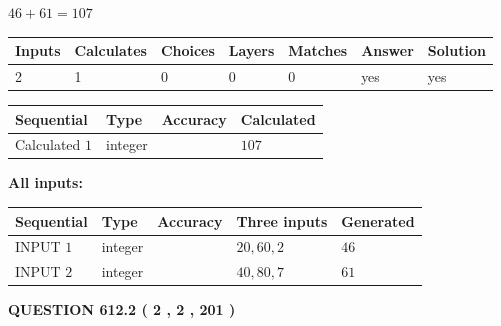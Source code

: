 \documentclass[12pt]{article}
\begin{document}
 

$ %
46 +  %
61=   %
107$
 
 
\noindent{}
 
 

 
   
   
   
   
\noindent\begin{tabular}{|l|l|l|l|l|l|l|}
 \hline
Inputs & Calculates & Choices & Layers & Matches & Answer & Solution \\ \hline
 2  & 
 1  & 
 0
  & 
 0  & 
 0  & 
  yes & 
  yes 
  \\ \hline
 \end{tabular}
   
   
   
   
\noindent{}
   
   
  
  
\noindent\begin{tabular}{|l|l|l|l|}
\hline
 Sequential & Type & Accuracy & Calculated \\ 
\hline
 
 
  Calculated $  1 $ & integer &  & 
  $ 107 $ 
 \\  \hline  
 \end{tabular}
   
   
   
   
\noindent\vspace{0.1in}\hspace{-0.08in} {\textbf{\Large{All inputs: }}}
   
   
  
  
\noindent\begin{tabular}{|l|l|l|l|l|}
\hline
 Sequential & Type & Accuracy & Three inputs & Generated \\ 
\hline
 
 
  INPUT $  1 $ & integer &  & $
 20
 , 
 60
 , 
 2
 $ & $ 46 $ 
 \\  \hline  
 
 
  INPUT $  2 $ & integer &  & $
 40
 , 
 80
 , 
 7
 $ & $ 61 $ 
 \\  \hline  
 \end{tabular}
   
   
  
\vspace{0.2in}
  
{\textbf{\Large{QUESTION
612.2 
 ( 2 , 2 , 201 )
}}}
  
\end{document}

